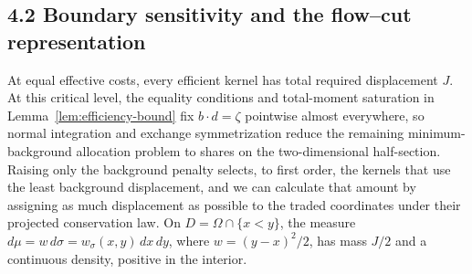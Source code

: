 

\subsection{4.2 Boundary sensitivity and the flow--cut representation}\label{sec:boundary-sensitivity}
At equal effective costs, every efficient kernel has total required displacement \(J\). At this critical level, the equality conditions and total-moment saturation in Lemma~\ref{lem:efficiency-bound} fix \(b\cdot d=\zeta\) pointwise almost everywhere, so normal integration and exchange symmetrization reduce the remaining minimum-background allocation problem to shares on the two-dimensional half-section. Raising only the background penalty selects, to first order, the kernels that use the least background displacement, and we can calculate that amount by assigning as much displacement as possible to the traded coordinates under their projected conservation law. On \(D=\Omega\cap\{x<y\}\), the measure \(d\mu=w\,d\sigma=w_\sigma(x,y)\,dx\,dy\), where \(w=(y-x)^2/2\), has mass \(J/2\) and a continuous density, positive in the interior.

